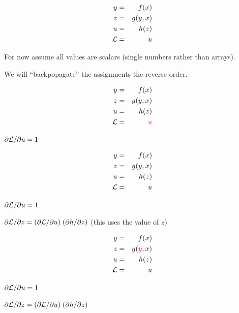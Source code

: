 {
\vspace{-3ex}
\begin{eqnarray*}
  y & = & f(x) \\
  z & = & g(y,x) \\
  u & = & h(z) \\
  {\cal L} & = & u
\end{eqnarray*}

\medskip
For now assume all values are scalars (single numbers rather than arrays).

\medskip
We will ``backpopagate'' the assignments the reverse order.

\vspace{-3ex}
\begin{eqnarray*}
  y & = & f(x) \\
  z & = & g(y,x) \\
  u & = & h(z) \\
  {\cal L} &  = & {\color{red} u}
\end{eqnarray*}

\medskip
{\color{red} ${\partial {\cal L}}/{\partial u} = 1$}

\vspace{-3ex}
\begin{eqnarray*}
  y & = & f(x) \\
  z & = & g(y,x) \\
  u & = & h({\color{red} z}) \\
  {\cal L} &  = &  u
\end{eqnarray*}

\medskip
${\partial {\cal L}}/{\partial u} = 1$

\medskip
{\color{red} ${\partial {\cal L}}/{\partial z} = ({\partial {\cal L}}/{\partial u})\; ({\partial h}/{\partial z})$} (this uses the value of $z$)

\vspace{-3ex}
\begin{eqnarray*}
  y & = & f(x) \\
  z & = & g({\color{red} y},x) \\
  u & = & h(z) \\
  {\cal L} &  = &  u
\end{eqnarray*}

\medskip
${\partial {\cal L}}/{\partial u} = 1$

\medskip
${\partial {\cal L}}/{\partial z} = ({\partial {\cal L}}/{\partial u})\; ({\partial h}/{\partial z})$

}
